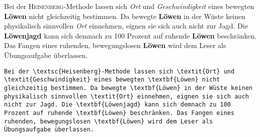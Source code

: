 \begin{frame}[fragile]
	\Losung
	\begin{outputbox}
			Bei der \textsc{Heisenberg}-Methode lassen sich \textit{Ort} und \textit{Geschwindigkeit} eines bewegten \textbf{Löwen} nicht gleichzeitig bestimmen. Da bewegte \textbf{Löwen} in der Wüste keinen physikalisch sinnvollen \textit{Ort} einnehmen, eignen sie sich auch nicht zur Jagd. Die \textbf{Löwenjagd} kann sich demnach zu 100 Prozent auf ruhende \textbf{Löwen} beschränken. Das Fangen eines ruhenden, bewegungslosen \textbf{Löwen} wird dem Leser als Übungsaufgabe überlassen.
	\end{outputbox}

	\Code
	\begin{lstlisting}
Bei der \textsc{Heisenberg}-Methode lassen sich \textit{Ort} und \textit{Geschwindigkeit} eines bewegten \textbf{Löwen} nicht gleichzeitig bestimmen. Da bewegte \textbf{Löwen} in der Wüste keinen physikalisch sinnvollen \textit{Ort} einnehmen, eignen sie sich auch nicht zur Jagd. Die \textbf{Löwenjagd} kann sich demnach zu 100 Prozent auf ruhende \textbf{Löwen} beschränken. Das Fangen eines ruhenden, bewegungslosen \textbf{Löwen} wird dem Leser als Übungsaufgabe überlassen.
	\end{lstlisting}
\end{frame}
